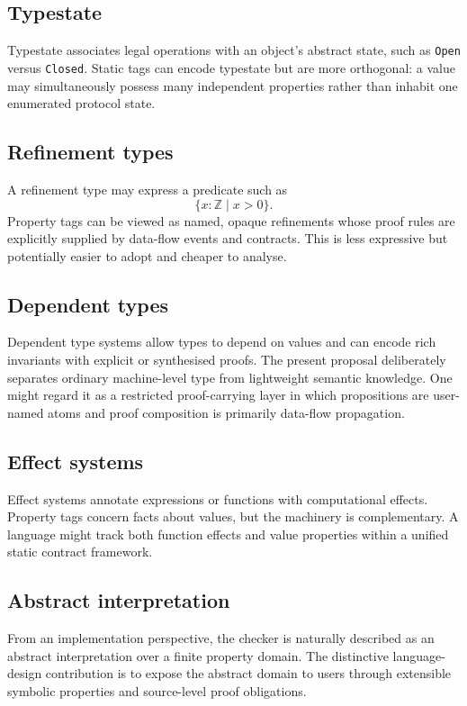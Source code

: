 \documentclass[11pt]{article}
\begin{document}
\subsection{Typestate}
Typestate associates legal operations with an object's abstract state, such as \texttt{Open} versus \texttt{Closed}. Static tags can encode typestate but are more orthogonal: a value may simultaneously possess many independent properties rather than inhabit one enumerated protocol state.

\subsection{Refinement types}
A refinement type may express a predicate such as
\[
\{x:\mathbb{Z}\mid x>0\}.
\]
Property tags can be viewed as named, opaque refinements whose proof rules are explicitly supplied by data-flow events and contracts. This is less expressive but potentially easier to adopt and cheaper to analyse.

\subsection{Dependent types}
Dependent type systems allow types to depend on values and can encode rich invariants with explicit or synthesised proofs. The present proposal deliberately separates ordinary machine-level type from lightweight semantic knowledge. One might regard it as a restricted proof-carrying layer in which propositions are user-named atoms and proof composition is primarily data-flow propagation.

\subsection{Effect systems}
Effect systems annotate expressions or functions with computational effects. Property tags concern facts about values, but the machinery is complementary. A language might track both function effects and value properties within a unified static contract framework.

\subsection{Abstract interpretation}
From an implementation perspective, the checker is naturally described as an abstract interpretation over a finite property domain. The distinctive language-design contribution is to expose the abstract domain to users through extensible symbolic properties and source-level proof obligations.
\end{document}
